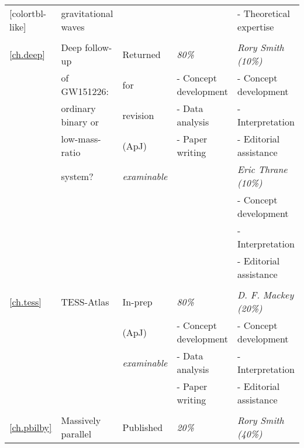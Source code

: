 \begin{table*}
\begin{NiceTabular}{V{50mm}V{2.9cm}V{1.3cm}V{3.4cm}V{3.5cm}}[colortbl-like]
                & gravitational waves &                       &                        & - Theoretical expertise    \\ 
                &                     &                       &                        &                            \\
\ref{ch.deep}   & Deep follow-up      & Returned              & \textit{80\%}          & \textit{Rory Smith (10\%)}          \\
                & of GW151226:        & for                   & - Concept development  & - Concept development      \\
                & ordinary binary or  & revision              & - Data analysis        & - Interpretation           \\
                & low-mass-ratio      & (ApJ)                 & - Paper writing        & - Editorial assistance     \\
                & system?             & \textit{examinable}   &                        & \textit{Eric Thrane (10\%)}         \\
                &                     &                       &                        & - Concept development      \\
                &                     &                       &                        & - Interpretation           \\
                &                     &                       &                        & - Editorial assistance     \\
                &                     &                       &                        &                            \\
\ref{ch.tess}   & TESS-Atlas          & In-prep               & \textit{80\%}          & \textit{D. F. Mackey (20\%)}  \\
                &                     & (ApJ)                 & - Concept development  & - Concept development      \\
                &                     & \textit{examinable}   & - Data analysis        & - Interpretation           \\
                &                     &                       & - Paper writing        & - Editorial assistance     \\
                &                     &                       &                        &                            \\
\ref{ch.pbilby} & Massively parallel  & Published             & \textit{20\%}          & \textit{Rory Smith (40\%)}          \\

\end{NiceTabular}
\end{table*}

